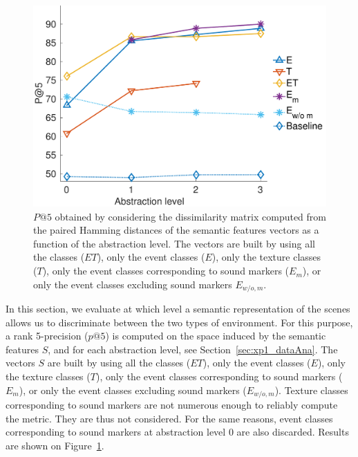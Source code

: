 \documentclass[12pt]{elsarticle}
\newcommand{\cf}{cf.}
\newcommand{\myfloatalign}{\centering}
\begin{document}
\begin{figure}[t]
        \myfloatalign
        \includegraphics[width=\linewidth]{gfx/pa5_1_en}
       \caption{$P@5$ obtained by considering the dissimilarity matrix computed from the paired Hamming distances of the semantic features vectors as a function of the abstraction level. The vectors are built by using all the classes ($ET$), only the event classes ($E$), only the texture classes ($T$), only the event classes corresponding to sound markers ($E_m$), or only the event classes excluding sound markers $E_{w/o,m}$.}\label{fig:pa5}
\end{figure}


In this section, we evaluate at which level a semantic representation of the scenes allows us to discriminate between the two types of environment. For this purpose, a rank 5-precision ($p@5$) is computed on the space induced by the semantic features $S$, and for each abstraction level, see Section~\ref{sec:xp1_dataAna}. The vectors $S$ are built by using all the classes ($ET$), only the event classes ($E$), only the texture classes ($T$), only the event classes corresponding to sound markers ($E_m$), or only the event classes excluding sound markers ($E_{w/o,m}$). Texture classes corresponding to sound markers are not numerous enough to reliably compute the metric. They are thus not considered. For the same reasons, event classes corresponding to sound markers at abstraction level $0$ are also discarded. Results are shown on Figure~\ref{fig:pa5}.
\end{document}
